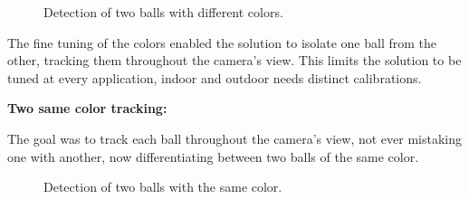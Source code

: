 \documentclass[10pt,twocolumn,letterpaper]{article}
\begin{document}
  \begin{figure}[!h]
    \centering
    \setlength{\fboxsep}{1pt}
    \setlength{\fboxrule}{1pt}
    \caption{Detection of two balls with different colors.}\label{fig:diff_color}
  \end{figure}

  The fine tuning of the colors enabled the solution to isolate one ball from
  the other, tracking them throughout the camera's view. This limits the
  solution to be tuned at every application, indoor  and outdoor needs
  distinct calibrations.

  \bigbreak{}
  \textbf{Two same color tracking:}
  \bigbreak{}

  The goal was to track each ball throughout the camera's view, not ever
  mistaking one with another, now differentiating between two balls of the same
  color.

  \begin{figure}[!h]
    \centering
    \setlength{\fboxsep}{1pt}
    \setlength{\fboxrule}{1pt}
    \caption{Detection of two balls with the same color.}\label{fig:same_color}
  \end{figure}
\end{document}
